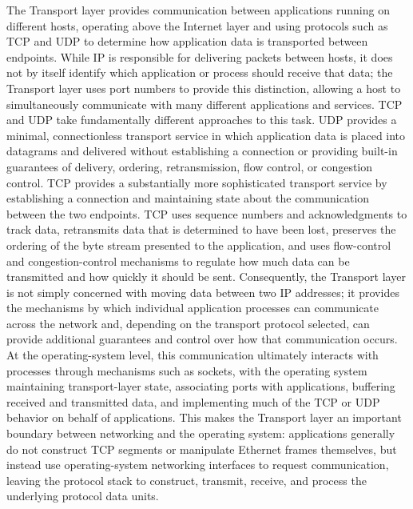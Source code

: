 \documentclass[12pt]{article}
\begin{document}
The Transport layer provides communication between applications running on different hosts, operating above the Internet layer and using protocols such as TCP and UDP to determine how application data is transported between endpoints. While IP is responsible for delivering packets between hosts, it does not by itself identify which application or process should receive that data; the Transport layer uses port numbers to provide this distinction, allowing a host to simultaneously communicate with many different applications and services. TCP and UDP take fundamentally different approaches to this task. UDP provides a minimal, connectionless transport service in which application data is placed into datagrams and delivered without establishing a connection or providing built-in guarantees of delivery, ordering, retransmission, flow control, or congestion control. TCP provides a substantially more sophisticated transport service by establishing a connection and maintaining state about the communication between the two endpoints. TCP uses sequence numbers and acknowledgments to track data, retransmits data that is determined to have been lost, preserves the ordering of the byte stream presented to the application, and uses flow-control and congestion-control mechanisms to regulate how much data can be transmitted and how quickly it should be sent. Consequently, the Transport layer is not simply concerned with moving data between two IP addresses; it provides the mechanisms by which individual application processes can communicate across the network and, depending on the transport protocol selected, can provide additional guarantees and control over how that communication occurs. At the operating-system level, this communication ultimately interacts with processes through mechanisms such as sockets, with the operating system maintaining transport-layer state, associating ports with applications, buffering received and transmitted data, and implementing much of the TCP or UDP behavior on behalf of applications. This makes the Transport layer an important boundary between networking and the operating system: applications generally do not construct TCP segments or manipulate Ethernet frames themselves, but instead use operating-system networking interfaces to request communication, leaving the protocol stack to construct, transmit, receive, and process the underlying protocol data units.\\
\end{document}
